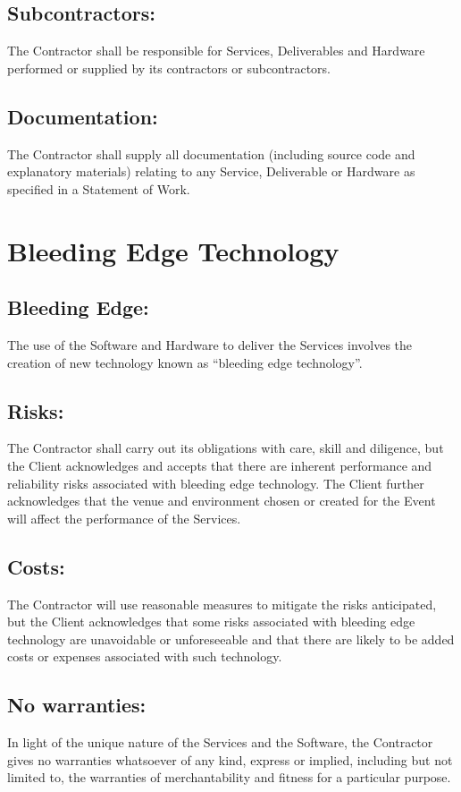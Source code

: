 \documentclass[a4paper,12pt]{article}
\begin{document}
\subsection{Subcontractors:}  The Contractor shall be responsible for Services, Deliverables and Hardware performed or supplied by its contractors or subcontractors.  
\subsection{Documentation:}  The Contractor shall supply all documentation (including source code and explanatory materials) relating to any Service, Deliverable or Hardware as specified in a Statement of Work.  
\section{Bleeding Edge Technology}
\subsection{Bleeding Edge:}  The use of the Software and Hardware to deliver the Services involves the creation of new technology known as “bleeding edge technology”.
\subsection{Risks:}  The Contractor shall carry out its obligations with care, skill and diligence, but the Client acknowledges and accepts that there are inherent performance and reliability risks associated with bleeding edge technology.  The Client further acknowledges that the venue and environment chosen or created for the Event will affect the performance of the Services.  
\subsection{Costs:}  The Contractor will use reasonable measures to mitigate the risks anticipated, but the Client acknowledges that some risks associated with bleeding edge technology are unavoidable or unforeseeable and that there are likely to be added costs or expenses associated with such technology.
\subsection{No warranties:}  In light of the unique nature of the Services and the Software, the Contractor gives no warranties whatsoever of any kind, express or implied, including but not limited to, the warranties of merchantability and fitness for a particular purpose.  
\end{document}
